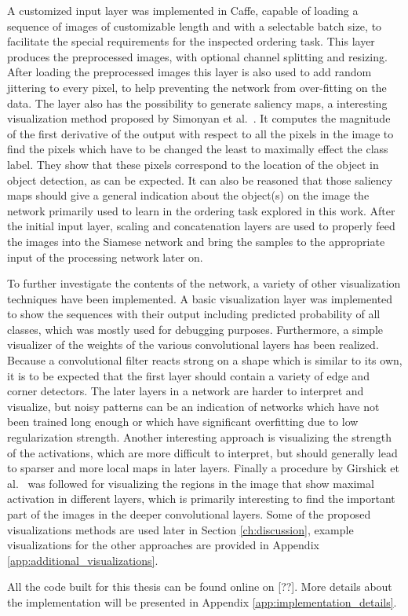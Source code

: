 A customized input layer was implemented in Caffe, capable of loading a sequence of images of customizable length and with a selectable batch size, to facilitate the special requirements for the inspected ordering task. This layer produces the preprocessed images, with optional channel splitting and resizing. After loading the preprocessed images this layer is also used to add random jittering to every pixel, to help preventing the network from over-fitting on the data. The layer also has the possibility to generate saliency maps, a interesting visualization method proposed by Simonyan et al.~\cite{simonyan2013}. It computes the magnitude of the first derivative of the output with respect to all the pixels in the image to find the pixels which have to be changed the least to maximally effect the class label. They show that these pixels correspond to the location of the object in object detection, as can be expected. It can also be reasoned that those saliency maps should give a general indication about the object(s) on the image the network primarily used to learn in the ordering task explored in this work. After the initial input layer, scaling and concatenation layers are used to properly feed the images into the Siamese network and bring the samples to the appropriate input of the processing network later on.

To further investigate the contents of the network, a variety of other visualization techniques have been implemented. A basic visualization layer was implemented to show the sequences with their output including predicted probability of all classes, which was mostly used for debugging purposes. Furthermore, a simple visualizer of the weights of the various convolutional layers has been realized. Because a convolutional filter reacts strong on a shape which is similar to its own, it is to be expected that the first layer should contain a variety of edge and corner detectors. The later layers in a network are harder to interpret and visualize, but noisy patterns can be an indication of networks which have not been trained long enough or which have significant overfitting due to low regularization strength. Another interesting approach is visualizing the strength of the activations, which are more difficult to interpret, but should generally lead to sparser and more local maps in later layers. Finally a procedure by Girshick et al.~\cite{girshick2014} was followed for visualizing the regions in the image that show maximal activation in different layers, which is primarily interesting to find the important part of the images in the deeper convolutional layers. Some of the proposed visualizations methods are used later in Section \ref{ch:discussion}, example visualizations for the other approaches are provided in Appendix \ref{app:additional_visualizations}.

All the code built for this thesis can be found online on [??].  More details about the implementation will be presented in Appendix \ref{app:implementation_details}.
